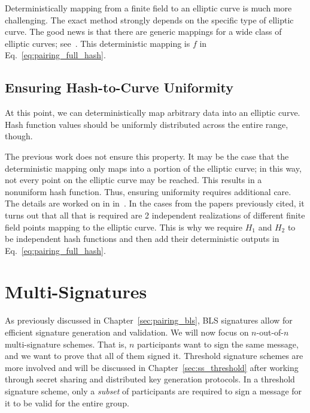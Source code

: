 Deterministically mapping from a \gls{finite field} to an \gls{elliptic curve}
is much more challenging.
The exact method strongly depends on the specific type of \gls{elliptic curve}.
The good news is that there are generic mappings for a wide class
of \glspl{elliptic curve};
see~\cite{brier2010efficient,fouque2012indifferentiable,BonehWahby2019}.
This deterministic mapping is $f$
in Eq.~\eqref{eq:pairing_full_hash}.

\subsection{Ensuring Hash-to-Curve Uniformity}

At this point, we can deterministically map arbitrary data
into an \gls{elliptic curve}.
Hash function values should be uniformly distributed across
the entire range, though.

The previous work does not ensure this property.
It may be the case that the deterministic mapping only maps into
a portion of the \gls{elliptic curve};
in this way, not every point on the \gls{elliptic curve} may be reached.
This results in a nonuniform \gls{hash function}.
Thus, ensuring uniformity requires additional care.
The details are worked on in
in~\cite{brier2010efficient,fouque2012indifferentiable,BonehWahby2019}.
In the cases from the papers previously cited,
it turns out that all that is required are 2 independent
realizations of different \gls{finite field} points mapping
to the \gls{elliptic curve}.
This is why we require $H_{1}$ and $H_{2}$ to be independent
\glspl{hash function}
and then add their deterministic outputs in Eq.~\eqref{eq:pairing_full_hash}.



\section{Multi-Signatures}

As previously discussed in Chapter~\ref{sec:pairing_bls},
BLS signatures allow for efficient signature generation and validation.
We will now focus on $n$-out-of-$n$ multi-signature schemes.
That is, $n$ participants want to sign the same message,
and we want to prove that all of them signed it.
Threshold signature schemes
are more involved and will be discussed in Chapter~\ref{sec:ss_threshold}
after working through secret sharing and \gls{distributed key generation}
protocols.
In a threshold signature scheme,
only a \emph{subset} of participants are required to sign
a message for it to be valid for the entire group.

